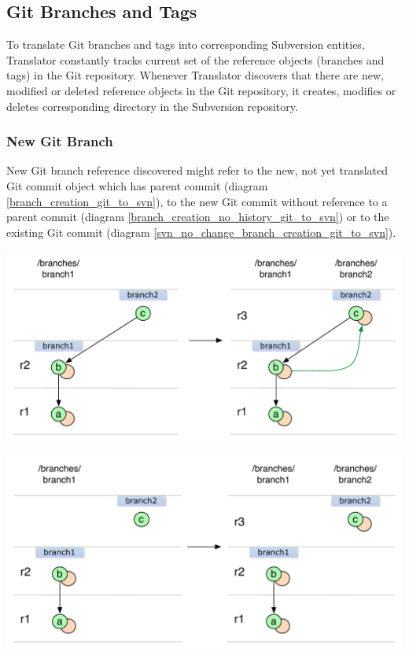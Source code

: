 \subsection{Git Branches and Tags}

To translate Git branches and tags into corresponding Subversion entities, Translator
constantly tracks current set of the reference objects (branches and tags) in the Git repository. Whenever 
Translator discovers that there are new, modified or deleted reference objects in the Git 
repository, it creates, modifies or deletes corresponding directory in the Subversion repository.
\subsubsection{New Git Branch}

New Git branch reference discovered might refer to the new, not yet translated Git commit object
which has parent commit (diagram \ref{branch_creation_git_to_svn}), to the new Git commit without
reference to a parent commit (diagram \ref{branch_creation_no_history_git_to_svn}) or to the 
existing Git commit (diagram \ref{svn_no_change_branch_creation_git_to_svn}).

\begin{center}
\includegraphics[width=\textwidth]{img/diagrams/branch_creation_git_to_svn.pdf}%
\label{branch_creation_git_to_svn}%
\end{center}

\begin{center}
\includegraphics[width=\textwidth]{img/diagrams/branch_creation_no_history_git_to_svn.pdf}%
\label{branch_creation_no_history_git_to_svn}%
\end{center}

